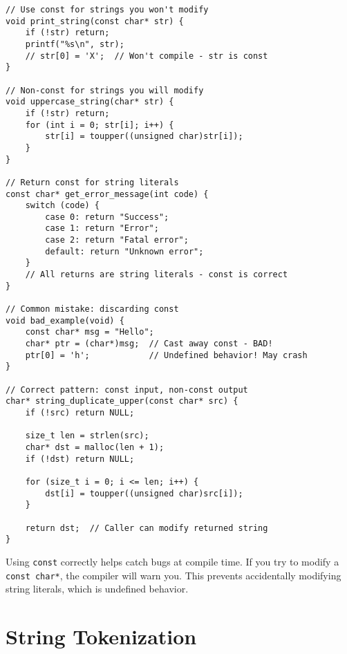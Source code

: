 \begin{lstlisting}
// Use const for strings you won't modify
void print_string(const char* str) {
    if (!str) return;
    printf("%s\n", str);
    // str[0] = 'X';  // Won't compile - str is const
}

// Non-const for strings you will modify
void uppercase_string(char* str) {
    if (!str) return;
    for (int i = 0; str[i]; i++) {
        str[i] = toupper((unsigned char)str[i]);
    }
}

// Return const for string literals
const char* get_error_message(int code) {
    switch (code) {
        case 0: return "Success";
        case 1: return "Error";
        case 2: return "Fatal error";
        default: return "Unknown error";
    }
    // All returns are string literals - const is correct
}

// Common mistake: discarding const
void bad_example(void) {
    const char* msg = "Hello";
    char* ptr = (char*)msg;  // Cast away const - BAD!
    ptr[0] = 'h';            // Undefined behavior! May crash
}

// Correct pattern: const input, non-const output
char* string_duplicate_upper(const char* src) {
    if (!src) return NULL;

    size_t len = strlen(src);
    char* dst = malloc(len + 1);
    if (!dst) return NULL;

    for (size_t i = 0; i <= len; i++) {
        dst[i] = toupper((unsigned char)src[i]);
    }

    return dst;  // Caller can modify returned string
}
\end{lstlisting}

\begin{tipbox}
Using \texttt{const} correctly helps catch bugs at compile time. If you try to modify a \texttt{const char*}, the compiler will warn you. This prevents accidentally modifying string literals, which is undefined behavior.
\end{tipbox}

\section{String Tokenization}

